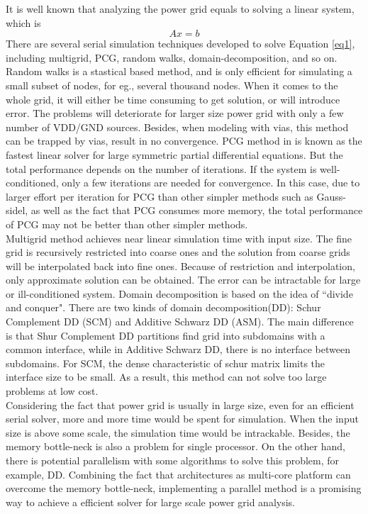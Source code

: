 \documentclass{sig-alternate}
\begin{document}
	It is well known that analyzing the power grid equals to solving a linear system, which is 
	\begin{equation}\label{eq1}
		Ax=b
	\end{equation}
	There are several serial simulation techniques developed to solve Equation \eqref{eq1}, including multigrid\cite{kozhaya}, 
	PCG\cite{Tsung-Hao}, random walks\cite{Boghrati}, domain-decomposition\cite{Quming,Zhongyu}, and so on. Random walks 
	is a stastical based method, and is only efficient for simulating a small subset of nodes, for eg., several thousand nodes.
	When it comes to the whole grid, it will either be time consuming to get solution, or will introduce error. The problems
	will deteriorate for larger size power grid with only a few number of VDD/GND sources. Besides, when modeling with vias, 
	this method can be trapped by vias, result in no convergence. PCG method in\cite{Tsung-Hao} is known as the fastest 
	linear solver 
	for large symmetric partial differential equations. But the total performance depends on the number of iterations. If the
	system is well-conditioned, only a few iterations are needed for convergence. In this case, due to larger effort per iteration
	for PCG than other simpler methods such as Gauss-sidel, as well as the fact that PCG consumes more memory, the total 
	performance of PCG may not be better than other simpler methods.\\	
	
	Multigrid method achieves near linear simulation time with input size. The fine grid is recursively restricted into coarse ones 
	and the solution from coarse grids will be interpolated back into fine ones. Because of restriction and interpolation, 
	only approximate solution can be obtained. The error can be intractable for large or ill-conditioned system. Domain 
	decomposition is based on the idea of ``divide and conquer". 
	There are two kinds of domain decomposition(DD): Schur Complement DD (SCM) and Additive Schwarz DD (ASM). The main difference 
	is that Shur 
	Complement DD partitions find grid into subdomains with a common interface, while in Additive Schwarz DD, there is no 
	interface between subdomains. For SCM, 
	the dense characteristic of schur matrix limits the interface size to be small. As a result, this method can not solve too 
	large problems at low cost.\\

	Considering the fact that power grid is usually in large size, even for an efficient serial solver, more and more time would be
	spent for simulation. When the input size is above some scale, the simulation time would be intrackable.
	Besides, the memory bottle-neck is also a problem for single processor. On the other hand, there is potential parallelism with
	some algorithms to solve this problem, for example, DD. Combining the fact that architectures as multi-core platform 
	can overcome the memory bottle-neck, implementing a parallel method is a promising way to achieve a efficient solver for 
	large scale power grid analysis.\\ 
\end{document}
